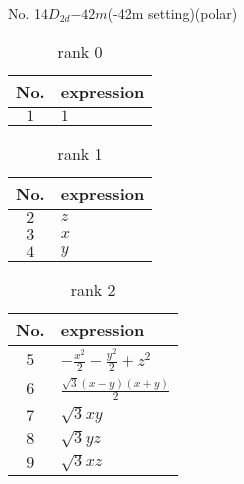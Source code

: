 \documentclass[fleqn,8pt,landscape]{jsarticle}
\begin{document}
\setcounter{MaxMatrixCols}{16}

\begin{center}
\LARGE
No. 14\quad$D_{2d}$\quad$-42m$\quad(-42m setting)\quad[ tetragonal ] (polar)
\end{center}
\begin{table}[ht!]
\begin{center}
\caption{rank 0}
\renewcommand{\arraystretch}{1.3}
\begin{tabular}{cl} \hline \hline
No. & expression \\ \hline
$ 1 $ & $ 1 $ \\
 \hline \hline
\end{tabular}
\end{center}
\end{table}
\begin{table}[ht!]
\begin{center}
\caption{rank 1}
\renewcommand{\arraystretch}{1.3}
\begin{tabular}{cl} \hline \hline
No. & expression \\ \hline
$ 2 $ & $ z $ \\
$ 3 $ & $ x $ \\
$ 4 $ & $ y $ \\
 \hline \hline
\end{tabular}
\end{center}
\end{table}
\begin{table}[ht!]
\begin{center}
\caption{rank 2}
\renewcommand{\arraystretch}{1.3}
\begin{tabular}{cl} \hline \hline
No. & expression \\ \hline
$ 5 $ & $ - \frac{x^{2}}{2} - \frac{y^{2}}{2} + z^{2} $ \\
$ 6 $ & $ \frac{\sqrt{3} \left(x - y\right) \left(x + y\right)}{2} $ \\
$ 7 $ & $ \sqrt{3} x y $ \\
$ 8 $ & $ \sqrt{3} y z $ \\
$ 9 $ & $ \sqrt{3} x z $ \\
 \hline \hline
\end{tabular}
\end{center}
\end{table}
\end{document}
